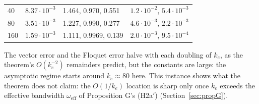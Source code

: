 \begin{itemize}
\begin{center}
\begin{tabularx}{\linewidth}{@{}llYY@{}}
    40  & $8.37\cdot10^{-3}$ & 1.464, 0.970, 0.551 & $1.2\cdot10^{-2}$, $5.4\cdot10^{-3}$\\
    80  & $3.51\cdot10^{-3}$ & 1.227, 0.990, 0.277 & $4.6\cdot10^{-3}$, $2.2\cdot10^{-3}$\\
    160 & $1.59\cdot10^{-3}$ & 1.111, 0.9969, 0.139 & $2.0\cdot10^{-3}$, $9.5\cdot10^{-4}$\\
    \bottomrule
    \end{tabularx}
    \end{center}
    The vector error and the Floquet error halve with each doubling of $k_e$, as the theorem's $O(k_e^{-2})$
    remainders predict, but the constants are large: the asymptotic regime starts around $k_e\approx80$ here. This
    instance shows what the theorem does not claim: the $O(1/k_e)$ location is sharp only once $k_e$ exceeds the
    effective bandwidth $\omega_{\mathrm{eff}}$ of Proposition G's (H2a$'$) (Section~\ref{sec:propG}).
\end{itemize}

